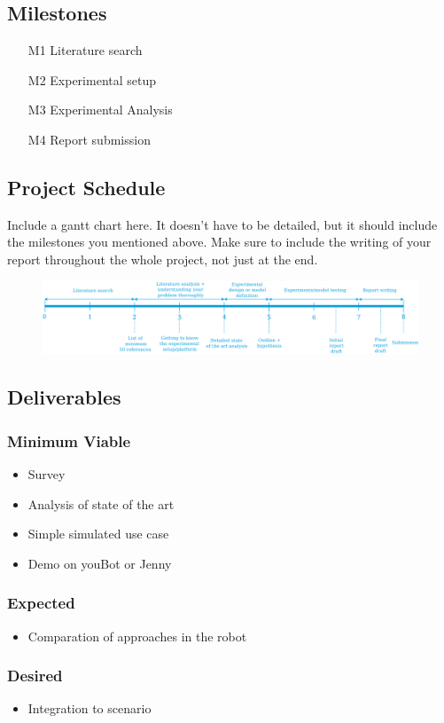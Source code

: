 \documentclass[rnd]{mas_proposal}
\begin{document}
\subsection{Milestones}
\begin{enumerate}
    \item[M1] Literature search
    \item[M2] Experimental setup
    \item[M3] Experimental Analysis
    \item[M4] Report submission
\end{enumerate}

\subsection{Project Schedule}
Include a gantt chart here. It doesn't have to be detailed, but it should include the milestones you mentioned above.
Make sure to include the writing of your report throughout the whole project, not just at the end.

\begin{figure}[h!]
    \caption{}
    \includegraphics[width=\textwidth]{images/rnd_deliverable_timeline}
    \label{}
\end{figure}

\subsection{Deliverables}
\subsubsection*{Minimum Viable}

\begin{itemize}
    \item Survey
    \item Analysis of state of the art
    \item Simple simulated use case
    \item Demo on youBot or Jenny
\end{itemize}

\subsubsection*{Expected}
\begin{itemize}
    \item Comparation of approaches in the robot
\end{itemize}

\subsubsection*{Desired}
\begin{itemize}
    \item Integration to scenario
\end{itemize}


\nocite{*}

\end{document}
